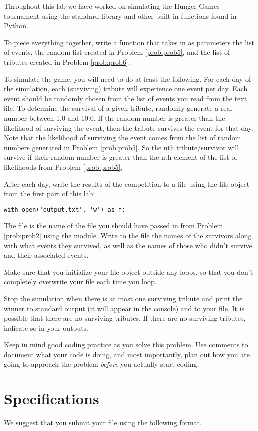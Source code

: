 \begin{problem}
Throughout this lab we have worked on simulating the Hunger Games tournament using the standard library and other built-in functions found in Python.

To piece everything together, write a function that takes in as parameters the list of events, the random list created in Problem \ref{prob:prob5}, and the list of tributes created in Problem \ref{prob:prob6}.

To simulate the game, you will need to do at least the following.
For each day of the simulation, each (surviving) tribute will experience one event per day. Each event should be randomly chosen from the list of events you read from the text file.
To determine the survival of a given tribute, randomly generate a real number between 1.0 and 10.0. 
If the random number is greater than the likelihood of surviving the event, then the tribute survives the event for that day. Note that the likelihood of surviving the event comes from the list of random numbers generated in Problem \ref{prob:prob5}. So the nth tribute/survivor will survive if their random number is greater than the nth element of the list of likelihoods from Problem \ref{prob:prob5}.

After each day, write the results of the competition to a file using the file object from the first part of this lab:

\begin{lstlisting}
with open('output.txt', 'w') as f:
\end{lstlisting}

The file  is the name of the file you should have passed in from Problem \ref{prob:prob2} using the  module. Write to the file the names of the survivors along with what events they survived, as well as the names of those who didn't survive and their associated events.

Make sure that you initialize your file object outside any loops, so that you don't completely overwrite your file each time you loop.

Stop the simulation when there is at most one surviving tribute and print the winner to standard output (it will appear in the console) and to your file.  It is possible that there are no surviving tributes.  If there are no surviving tributes, indicate so in your outputs.

Keep in mind good coding practice as you solve this problem. Use comments to document what your code is doing, and most importantly, plan out how you are going to approach the problem \emph{before} you actually start coding. 

\end{problem}

\section*{Specifications}
We suggest that you submit your  file using the following format.





